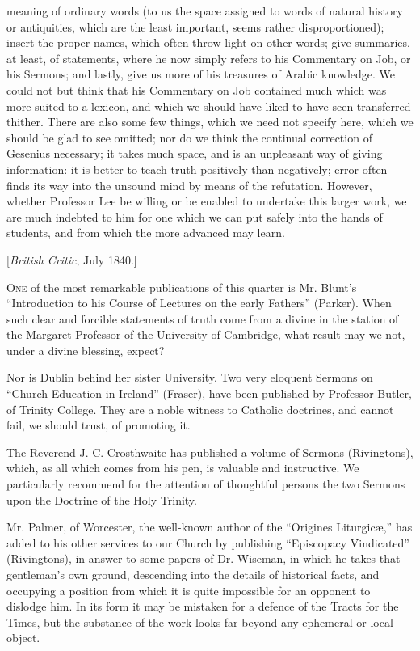 meaning of ordinary words (to us the space assigned to words of natural
history or antiquities, which are the least important, seems rather
disproportioned); insert the proper names, which often throw light on
other words; give summaries, at least, of statements, where he now
simply refers to his Commentary on Job, or his Sermons; and lastly, give
us more of his treasures of Arabic knowledge. We could not but think
that his Commentary on Job contained much which was more suited to a
lexicon, and which we should have liked to have seen transferred
thither. There are also some few things, which we need not specify here,
which we should be glad to see omitted; nor do we think the continual
correction of Gesenius necessary; it takes much space, and is an
unpleasant way of giving information: it is better to teach truth
positively than negatively; error often finds its way into the unsound
mind by means of the refutation. However, whether Professor Lee be
willing or be enabled to undertake this larger work, we are much
indebted to him for one which we can put safely into the hands of
students, and from which the more advanced may learn.


[\emph{British Critic}, July 1840.]

O\textsc{ne} of the most
remarkable publications of this quarter is Mr. Blunt's ``Introduction to
his Course of Lectures on the early Fathers'' (Parker). When such clear
and forcible statements of truth come from a divine in the station of
the Margaret Professor of the University of Cambridge, what result may
we not, under a divine blessing, expect?

Nor is Dublin behind her sister University. Two
very eloquent Sermons on ``Church Education in Ireland'' (Fraser), have
been published by Professor Butler, of Trinity College. They are a noble
witness to Catholic doctrines, and cannot fail, we should trust, of
promoting it.

The Reverend J. C. Crosthwaite has published a
volume of Sermons (Rivingtons), which, as all which comes from his pen,
is valuable and instructive. We particularly recommend for the attention
of thoughtful persons the two Sermons upon the Doctrine of the Holy
Trinity.

Mr. Palmer, of Worcester, the well-known author of
the ``Origines Liturgicæ,'' has added to his other services to our Church
by publishing ``Episcopacy Vindicated'' (Rivingtons), in answer to some
papers of Dr. Wiseman, in which he takes that gentleman's own ground,
descending into the details of historical facts, and occupying a
position from which it is quite impossible for an opponent to dislodge
him. In its form it may be mistaken for a defence of the Tracts for the
Times, but the substance of the work looks far beyond any ephemeral or
local object.

